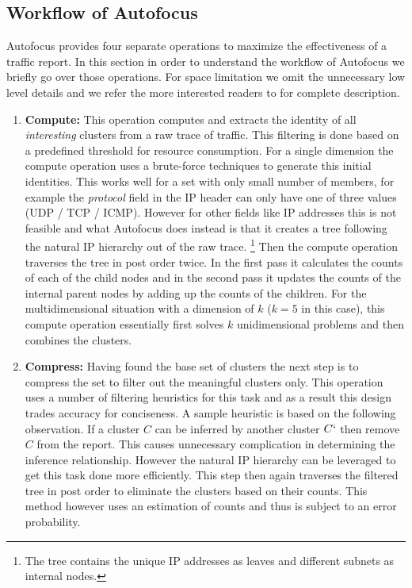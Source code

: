\documentclass[twocolumn]{article}
\begin{document}
\subsection{Workflow of Autofocus}
Autofocus provides four separate operations to maximize the effectiveness of a traffic report. In this section in order to understand the workflow of Autofocus we briefly go over those operations. For space limitation we omit the unnecessary low level details and we refer the more interested readers to \cite{autofocus} for complete description. 

\begin{enumerate}
\item \textbf{Compute: } This operation computes and extracts the identity of all \emph{interesting} clusters from a raw trace of traffic. This filtering is done based on a predefined threshold for resource consumption. For a single dimension the compute operation uses a brute-force techniques to generate this initial identities. This works well for a set with only small number of members, for example the \emph{protocol} field in the IP header can only have one of three values (UDP / TCP / ICMP). However for other fields like IP addresses this is not feasible and what Autofocus does instead is that it creates a tree following the natural IP hierarchy out of the raw trace. \footnote{The tree contains the unique IP addresses as leaves and different subnets as internal nodes.} Then the compute operation traverses the tree in  post order twice. In the first pass it calculates the counts of each of the child nodes and in the second pass it updates the counts of the internal parent nodes by adding up the counts of the children. For the multidimensional situation with a dimension of $k$ ($k=5$ in this case), this compute operation essentially first solves $k$ unidimensional problems and then combines the clusters.

 \item \textbf{Compress: } Having found the base set of clusters the next step is to compress the set to filter out the meaningful clusters only. This operation uses a number of filtering heuristics for this task and as a result this design trades accuracy for conciseness. A sample heuristic is based on the following observation. If a cluster $C$ can be inferred by another cluster $C`$ then remove $C$ from the report. This causes unnecessary complication in determining the inference relationship. However the natural IP hierarchy can be leveraged to get this task done more efficiently. This step then again traverses the filtered tree in post order to eliminate the clusters based on their counts. This method however uses an estimation of counts and thus is subject to an error probability. 
 

\end{enumerate}
\end{document}
